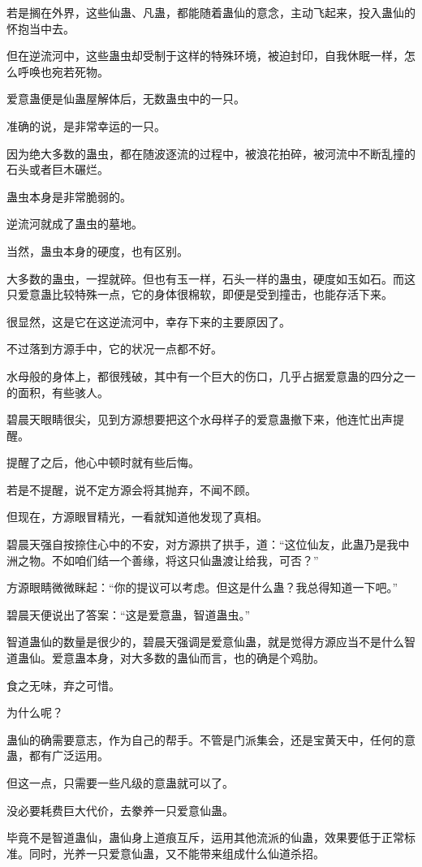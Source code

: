 \begin{this_body}
若是搁在外界，这些仙蛊、凡蛊，都能随着蛊仙的意念，主动飞起来，投入蛊仙的怀抱当中去。

但在逆流河中，这些蛊虫却受制于这样的特殊环境，被迫封印，自我休眠一样，怎么呼唤也宛若死物。

爱意蛊便是仙蛊屋解体后，无数蛊虫中的一只。

准确的说，是非常幸运的一只。

因为绝大多数的蛊虫，都在随波逐流的过程中，被浪花拍碎，被河流中不断乱撞的石头或者巨木碾烂。

蛊虫本身是非常脆弱的。

逆流河就成了蛊虫的墓地。

当然，蛊虫本身的硬度，也有区别。

大多数的蛊虫，一捏就碎。但也有玉一样，石头一样的蛊虫，硬度如玉如石。而这只爱意蛊比较特殊一点，它的身体很棉软，即便是受到撞击，也能存活下来。

很显然，这是它在这逆流河中，幸存下来的主要原因了。

不过落到方源手中，它的状况一点都不好。

水母般的身体上，都很残破，其中有一个巨大的伤口，几乎占据爱意蛊的四分之一的面积，有些骇人。

碧晨天眼睛很尖，见到方源想要把这个水母样子的爱意蛊撤下来，他连忙出声提醒。

提醒了之后，他心中顿时就有些后悔。

若是不提醒，说不定方源会将其抛弃，不闻不顾。

但现在，方源眼冒精光，一看就知道他发现了真相。

碧晨天强自按捺住心中的不安，对方源拱了拱手，道：“这位仙友，此蛊乃是我中洲之物。不如咱们结一个善缘，将这只仙蛊渡让给我，可否？”

方源眼睛微微眯起：“你的提议可以考虑。但这是什么蛊？我总得知道一下吧。”

碧晨天便说出了答案：“这是爱意蛊，智道蛊虫。”

智道蛊仙的数量是很少的，碧晨天强调是爱意仙蛊，就是觉得方源应当不是什么智道蛊仙。爱意蛊本身，对大多数的蛊仙而言，也的确是个鸡肋。

食之无味，弃之可惜。

为什么呢？

蛊仙的确需要意志，作为自己的帮手。不管是门派集会，还是宝黄天中，任何的意蛊，都有广泛运用。

但这一点，只需要一些凡级的意蛊就可以了。

没必要耗费巨大代价，去豢养一只爱意仙蛊。

毕竟不是智道蛊仙，蛊仙身上道痕互斥，运用其他流派的仙蛊，效果要低于正常标准。同时，光养一只爱意仙蛊，又不能带来组成什么仙道杀招。


\end{this_body}

